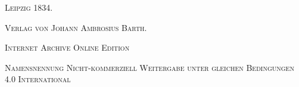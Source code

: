 \documentclass[a4paper, 11pt, oneside]{article}
\begin{document}
\begin{titlepage}
	\vspace{1\baselineskip}

	{\Large\scshape Leipzig 1834.}
	
	{\Large\scshape{Verlag von Johann Ambrosius Barth.}}
	
	\vspace{0.5\baselineskip} %

    \scshape\Large Internet Archive Online Edition  %
	
	{\scshape\Large Namensnennung Nicht-kommerziell Weitergabe unter gleichen Bedingungen 4.0 International} %
\end{titlepage}
\setlength{\parskip}{1mm plus1mm minus1mm}
\clearpage
\pagestyle{fancy}
\fancyhf{}
\cfoot{\swabfamily{\thepage}}
\tableofcontents
\clearpage
\LARGE
\section*{}
\end{document}
